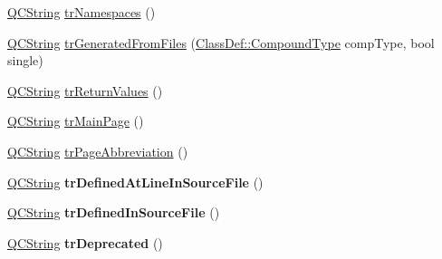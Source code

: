 \begin{DoxyCompactItemize}
\item 
\hyperlink{class_q_c_string}{Q\-C\-String} \hyperlink{class_translator_croatian_abb4bb29699b00eecd57abd489abbffd0}{tr\-Namespaces} ()
\item 
\hyperlink{class_q_c_string}{Q\-C\-String} \hyperlink{class_translator_croatian_a2c9f8ab8b1a6ef2b514ceaf4f2fbfcdb}{tr\-Generated\-From\-Files} (\hyperlink{class_class_def_a768a6f0a6fd7e9087ff7971abbcc3f36}{Class\-Def\-::\-Compound\-Type} comp\-Type, bool single)
\item 
\hyperlink{class_q_c_string}{Q\-C\-String} \hyperlink{class_translator_croatian_a6e464db5f9409cf3e05373c732034db5}{tr\-Return\-Values} ()
\item 
\hyperlink{class_q_c_string}{Q\-C\-String} \hyperlink{class_translator_croatian_a55afa9d76071992e385357f6cffb37ae}{tr\-Main\-Page} ()
\item 
\hyperlink{class_q_c_string}{Q\-C\-String} \hyperlink{class_translator_croatian_a4248866912d235cac5f7336db70fff9a}{tr\-Page\-Abbreviation} ()
\item 
\hypertarget{class_translator_croatian_adc253b88ffe7628a37260627a8c0b29a}{\hyperlink{class_q_c_string}{Q\-C\-String} {\bfseries tr\-Defined\-At\-Line\-In\-Source\-File} ()}\label{class_translator_croatian_adc253b88ffe7628a37260627a8c0b29a}

\item 
\hypertarget{class_translator_croatian_aa11e744c82b96bf72abdf5edeed3ea55}{\hyperlink{class_q_c_string}{Q\-C\-String} {\bfseries tr\-Defined\-In\-Source\-File} ()}\label{class_translator_croatian_aa11e744c82b96bf72abdf5edeed3ea55}

\item 
\hypertarget{class_translator_croatian_ae6520e844a4d922882ef91f7598c792f}{\hyperlink{class_q_c_string}{Q\-C\-String} {\bfseries tr\-Deprecated} ()}\label{class_translator_croatian_ae6520e844a4d922882ef91f7598c792f}


\end{DoxyCompactItemize}
